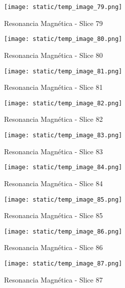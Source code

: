 \documentclass[12pt,a4paper]{article}%
\begin{document}
%


\begin{figure}[H]%
\centering%
\texttt{[image: static/temp\_image\_79.png]}%
\caption{Resonancia Magnética {-} Slice 79}%
\end{figure}

%


\begin{figure}[H]%
\centering%
\texttt{[image: static/temp\_image\_80.png]}%
\caption{Resonancia Magnética {-} Slice 80}%
\end{figure}

%


\begin{figure}[H]%
\centering%
\texttt{[image: static/temp\_image\_81.png]}%
\caption{Resonancia Magnética {-} Slice 81}%
\end{figure}

%


\begin{figure}[H]%
\centering%
\texttt{[image: static/temp\_image\_82.png]}%
\caption{Resonancia Magnética {-} Slice 82}%
\end{figure}

%


\begin{figure}[H]%
\centering%
\texttt{[image: static/temp\_image\_83.png]}%
\caption{Resonancia Magnética {-} Slice 83}%
\end{figure}

%


\begin{figure}[H]%
\centering%
\texttt{[image: static/temp\_image\_84.png]}%
\caption{Resonancia Magnética {-} Slice 84}%
\end{figure}

%


\begin{figure}[H]%
\centering%
\texttt{[image: static/temp\_image\_85.png]}%
\caption{Resonancia Magnética {-} Slice 85}%
\end{figure}

%


\begin{figure}[H]%
\centering%
\texttt{[image: static/temp\_image\_86.png]}%
\caption{Resonancia Magnética {-} Slice 86}%
\end{figure}

%


\begin{figure}[H]%
\centering%
\texttt{[image: static/temp\_image\_87.png]}%
\caption{Resonancia Magnética {-} Slice 87}%
\end{figure}
\end{document}
